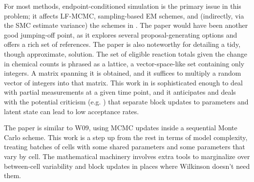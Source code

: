 \documentclass{article}
\begin{document}
For most methods, endpoint-conditioned simulation is the primary issue in this problem; it affects LF-MCMC, sampling-based EM schemes, and (indirectly, via the SMC estimate variance) the schemes in \cite{golightly2011bayesian,owen2014scalable}. The paper \cite{golightly2014smc_b_subtilis} would have been another good jumping-off point, as it explores several proposal-generating options and offers a rich set of references. The paper \cite{amrein2012rate} is also noteworthy for detailing a tidy, though approximate, solution. The set of eligible reaction totals given the change in chemical counts is phrased as a lattice, a vector-space-like set containing only integers. A matrix spanning it is obtained, and it suffices to multiply a random vector of integers into that matrix. This work in \cite{amrein2012rate} is sophisticated enough to deal with partial measurements at a given time point, and it anticipates and deals with the potential criticism (e.g. \cite{golightly2011bayesian}) that separate block updates to parameters and latent state can lead to low acceptance rates.

The paper \cite{zechner2014scalable} is similar to W09, using MCMC updates inside a sequential Monte Carlo scheme. This work is a step up from the rest in terms of model complexity, treating batches of cells with some shared parameters and some parameters that vary by cell. The mathematical machinery involves extra tools to marginalize over between-cell variability and block updates in places where Wilkinson doesn't need them. 

\end{document}
